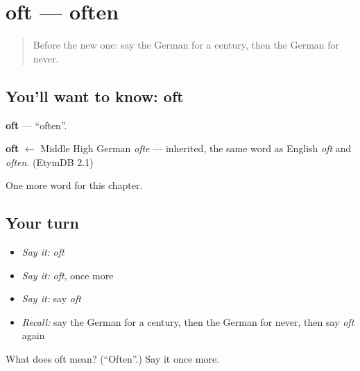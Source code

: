 \section[oft]{oft — often}

\label{lesson:GE-C137-oft}



\begin{quote}
Before the new one: say the German for a century, then the German for never.
\end{quote}

\subsection*{You'll want to know: oft}
\textbf{oft} — \textquotedblleft{}often\textquotedblright{}.

\begin{cousinweb}
\textbf{oft} $\leftarrow$ Middle High German \emph{ofte} — inherited, the same word as English \emph{oft} and \emph{often}. (EtymDB 2.1)
\end{cousinweb}

\begin{grammarlens}[title={What you've built}]
One more word for this chapter.
\end{grammarlens}

\subsection*{Your turn}
\begin{itemize}
\raggedright
  \item \emph{Say it:} \emph{oft}
  \item \emph{Say it:} \emph{oft}, once more
  \item \emph{Say it:} say \emph{oft}
  \item \emph{Recall:} say the German for a century, then the German for never, then say \emph{oft} again
\end{itemize}

\begin{tcolorbox}[breakable,colback=teal!4,colframe=teal!35!black,title={Before you move on}]
What does oft mean? (\textquotedblleft{}Often\textquotedblright{}.) Say it once more.
\end{tcolorbox}
